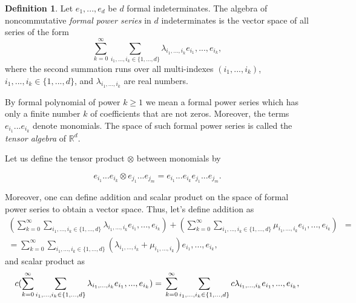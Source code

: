 \documentclass[12pt,a4paper]{report}
\theoremstyle{definition}
\newtheorem{definition}{Definition}
\begin{document}
\begin{definition}
	Let $e_1, . . . , e_d$ be $d$ formal indeterminates. The algebra of noncommutative \textit{formal power series} in $d$ indeterminates is the vector space of all series of the form
	\begin{equation}
		\sum_{k=0}^{\infty}\sum_{i_1, . . . , i_k \in \{1,...,d\}}\lambda_{i_1, . . . , i_k}e_{i_1}, . . . ,e_{i_k},
	\end{equation}
where the second summation runs over all multi-indexes $(i_1, . . . , i_k)$, $i_1, . . . , i_k \in \{1, . . . , d\}$, and $\lambda_{i_1, . . . , i_k}$ are real numbers.
\end{definition}

By formal polynomial of power $k\geq1$ we mean a formal power series which has only a finite number $k$ of coefficients that are not zeros. Moreover, the terms $e_{i_1} . . . e_{i_k}$ denote monomials. The space of such formal power series is called the \textit{tensor algebra} of $\mathbb{R}^d$.


Let us define the tensor product $\otimes$ between monomials by

\begin{equation}
	e_{i_1} . . . e_{i_k}\otimes e_{j_1} . . . e_{j_m}=e_{i_1} . . . e_{i_k}e_{j_1} . . . e_{j_m}.
\end{equation}

Moreover, one can define addition and scalar product on the space of formal power series to obtain a vector space. Thus, let's define addition as
\begin{equation}
	\begin{aligned}
	(\sum_{k=0}^{\infty}\sum_{i_1, . . . , i_k \in \{1,...,d\}}\lambda_{i_1, . . . , i_k}e_{i_1}, . . . ,e_{i_k})+	(\sum_{k=0}^{\infty}\sum_{i_1, . . . , i_k \in \{1,...,d\}}\mu_{i_1, . . . , i_k}e_{i_1}, . . . ,e_{i_k})&= \\	=\sum_{k=0}^{\infty}\sum_{i_1, . . . , i_k \in \{1,...,d\}}(\lambda_{i_1, . . . , i_k}+\mu_{i_1, . . . , i_k})e_{i_1}, . . . ,e_{i_k},
	\end{aligned}
\end{equation}
 and scalar product as
 \begin{equation}
 	c(\sum_{k=0}^{\infty}\sum_{i_1, . . . , i_k \in \{1,...,d\}}\lambda_{i_1, . . . , i_k}e_{i_1}, . . . ,e_{i_k})= \\\sum_{k=0}^{\infty}\sum_{i_1, . . . , i_k \in \{1,...,d\}}c\lambda_{i_1, . . . , i_k}e_{i_1}, . . . ,e_{i_k},
 \end{equation}
\end{document}
